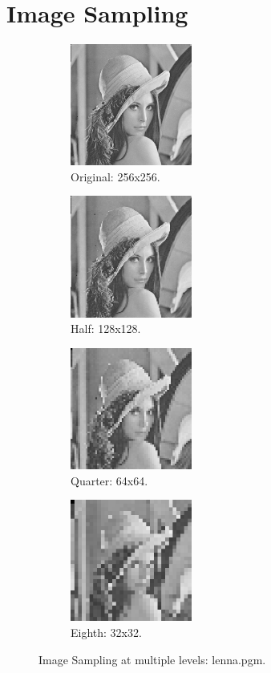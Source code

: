 \documentclass[letterpaper,10pt]{article}
\begin{document}
\section{Image Sampling}
\begin{figure}[hbtp]
  \centering
  \begin{subfigure}{4cm}
    \includegraphics[width=4cm]{images/lenna.png}
    \caption{Original: 256x256.}
  \end{subfigure}
  \begin{subfigure}{4cm}
    \includegraphics[width=4cm]{images/lenna_subsample128.png}
    \caption{Half: 128x128.}
  \end{subfigure}
  \begin{subfigure}{4cm}
    \includegraphics[width=4cm]{images/lenna_subsample64.png}
    \caption{Quarter: 64x64.}
  \end{subfigure}
  \begin{subfigure}{4cm}
    \includegraphics[width=4cm]{images/lenna_subsample32.png}
    \caption{Eighth: 32x32.}
  \end{subfigure}
  \caption{Image Sampling at multiple levels: lenna.pgm.}
  \label{fig:samplelenna}
\end{figure}
\end{document}
